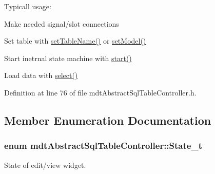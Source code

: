 Typicall usage\-:
\begin{DoxyItemize}
\item Make needed signal/slot connections
\item Set table with \hyperlink{classmdt_abstract_sql_table_controller_a5a94417dc46a7dc6de8b5ba0593494a7}{set\-Table\-Name()} or \hyperlink{classmdt_abstract_sql_table_controller_ac9e64cf30e552ec65ed5fdd861320676}{set\-Model()}
\item Start inetrnal state machine with \hyperlink{classmdt_abstract_sql_table_controller_a06b594e9ebed9417ab15edcddaf0f05b}{start()}
\item Load data with \hyperlink{classmdt_abstract_sql_table_controller_ae26ede862ac54ece9243b264ea22cefb}{select()} 
\end{DoxyItemize}

Definition at line 76 of file mdt\-Abstract\-Sql\-Table\-Controller.\-h.



\subsection{Member Enumeration Documentation}
\hypertarget{classmdt_abstract_sql_table_controller_a63536182561f551ccb7616e1786793cd}{
\subsubsection[{State\-\_\-t}]{\setlength{\rightskip}{0pt plus 5cm}enum {\bf mdt\-Abstract\-Sql\-Table\-Controller\-::\-State\-\_\-t}}}\label{classmdt_abstract_sql_table_controller_a63536182561f551ccb7616e1786793cd}


State of edit/view widget. 

